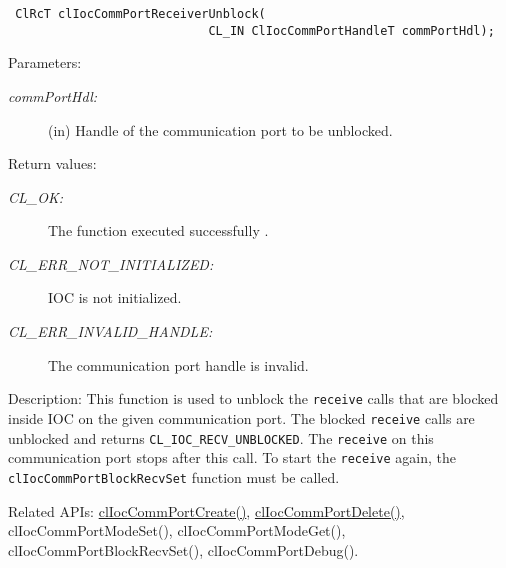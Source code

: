 \begin{flushleft}
\begin{Desc}
\footnotesize\begin{verbatim} ClRcT clIocCommPortReceiverUnblock( 
                  			CL_IN ClIocCommPortHandleT commPortHdl); 
\end{verbatim}
\normalsize
\end{Desc}
\begin{Desc}
\item[Parameters:]
\begin{description}
\item[{\em comm\-Port\-Hdl:}](in) Handle of the communication port to be unblocked.\end{description}
\end{Desc}
\begin{Desc}
\item[Return values:]
\begin{description}
\item[{\em CL\_\-OK:}]The function executed successfully . 
\item[{\em CL\_\-ERR\_\-NOT\_\-INITIALIZED:}]IOC is not initialized. 
\item[{\em CL\_\-ERR\_\-INVALID\_\-HANDLE:}] The communication port handle is invalid.\end{description}
\end{Desc}
\begin{Desc}
\item[Description:]This function is used to unblock the {\tt{receive}} calls that are blocked inside IOC on the given communication port. The blocked 
{\tt{receive}} calls are unblocked and returns {\tt{CL\_\-IOC\_\-RECV\_\-UNBLOCKED}}. The {\tt{receive}} on this communication port 
stops after this call. To start the {\tt{receive}} again, the {\tt{clIocCommPortBlockRecvSet}} function must be called.\end{Desc}
\begin{Desc}
\item[Related APIs:]\hyperlink{pageioc101}{clIocCommPortCreate()}, \hyperlink{pageioc103}{clIocCommPortDelete()}, 
clIocCommPortModeSet(), clIocCommPortModeGet(), clIocCommPortBlockRecvSet(), clIocCommPortDebug(). \end{Desc}
\newpage




\end{flushleft}
